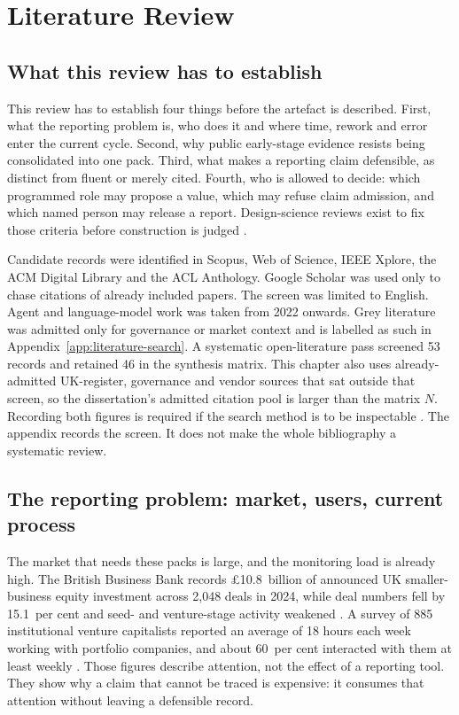 \chapter{Literature Review}
\section{What this review has to establish}

This review has to establish four things before the artefact is described. First, what the
reporting problem is, who does it and where time, rework and error enter the current cycle.
Second, why public early-stage evidence resists being consolidated into one pack. Third, what
makes a reporting claim defensible, as distinct from fluent or merely cited. Fourth, who is
allowed to decide: which programmed role may propose a value, which may refuse claim admission,
and which named person may release a report. Design-science reviews exist to fix those criteria
before construction is judged \citep{hevner2004design,peffers2007dsrm}.

Candidate records were identified in Scopus, Web of Science, IEEE Xplore, the ACM Digital Library
and the ACL Anthology. Google Scholar was used only to chase citations of already included papers.
The screen was limited to English. Agent and language-model work was taken from 2022 onwards.
Grey literature was admitted only for governance or market context and is labelled as such in
Appendix~\ref{app:literature-search}. A systematic open-literature pass screened 53 records and
retained 46 in the synthesis matrix. This chapter also uses already-admitted UK-register,
governance and vendor sources that sat outside that screen, so the dissertation's admitted
citation pool is larger than the matrix $N$. Recording both figures is required if the search
method is to be inspectable \citep{pineau2021reproducibility,gebru2021datasheets}. The appendix
records the screen. It does not make the whole bibliography a systematic review.

\section{The reporting problem: market, users, current process}
\label{sec:reporting-problem}

The market that needs these packs is large, and the monitoring load is already high. The British
Business Bank records \pounds10.8~billion of announced UK smaller-business equity investment
across 2,048 deals in 2024, while deal numbers fell by 15.1~per cent and seed- and venture-stage
activity weakened \citep{britishbusinessbank2025equity}. A survey of 885 institutional venture
capitalists reported an average of 18 hours each week working with portfolio companies, and about
60~per cent interacted with them at least weekly \citep{gompers2016vcdecisions}. Those figures
describe attention, not the effect of a reporting tool. They show why a claim that cannot be
traced is expensive: it consumes that attention without leaving a defensible record.

